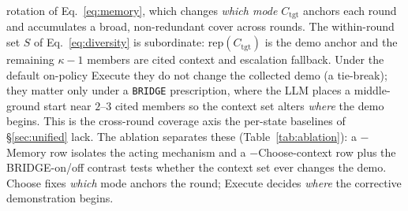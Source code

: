 \documentclass[letterpaper]{article} %
\begin{document}
rotation of Eq.~\ref{eq:memory}, which changes \emph{which mode} $C_{\mathrm{tgt}}$
anchors each round and accumulates a broad, non-redundant cover across rounds. The
within-round set $S$ of Eq.~\ref{eq:diversity} is subordinate:
$\mathrm{rep}(C_{\mathrm{tgt}})$ is the demo anchor and the remaining $\kappa{-}1$
members are cited context and escalation fallback. Under the default on-policy
Execute they do not change the collected demo (a tie-break); they matter only under
a \texttt{BRIDGE} prescription, where the LLM places a middle-ground start near
$2$--$3$ cited members so the context set alters \emph{where} the demo begins. This
is the cross-round coverage axis the per-state baselines of \S\ref{sec:unified} lack.
The ablation separates these (Table~\ref{tab:ablation}): a $-$Memory row isolates the
acting mechanism and a $-$Choose-context row plus the BRIDGE-on/off contrast tests
whether the context set ever changes the demo. Choose fixes \emph{which} mode anchors
the round; Execute decides \emph{where} the corrective demonstration begins.
\end{document}
